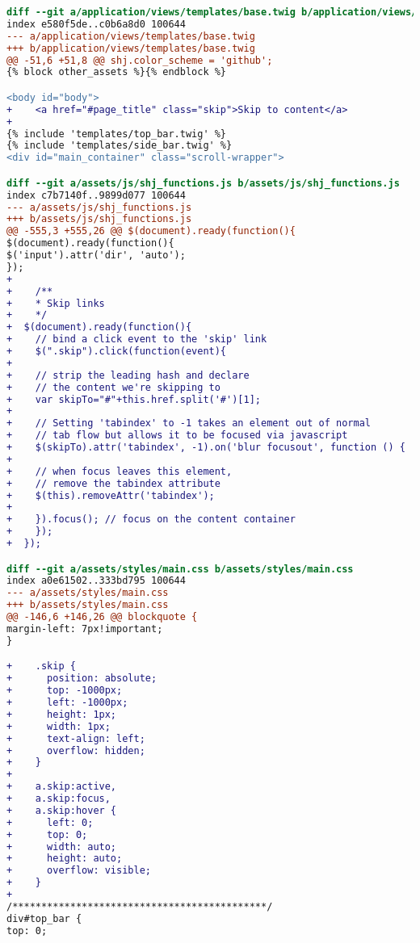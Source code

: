 \begin{lstlisting}[language=diff, caption=Perubahan untuk mematuhi kriteria 2.4.1, label=lst_2.4.1, basicstyle=\ttfamily, frame=single,
columns=fullflexible, keepspaces=true, breaklines=true]
diff --git a/application/views/templates/base.twig b/application/views/templates/base.twig
index e580f5de..c0b6a8d0 100644
--- a/application/views/templates/base.twig
+++ b/application/views/templates/base.twig
@@ -51,6 +51,8 @@ shj.color_scheme = 'github';
{% block other_assets %}{% endblock %}

<body id="body">
+    <a href="#page_title" class="skip">Skip to content</a>
+    
{% include 'templates/top_bar.twig' %}
{% include 'templates/side_bar.twig' %}
<div id="main_container" class="scroll-wrapper">

diff --git a/assets/js/shj_functions.js b/assets/js/shj_functions.js
index c7b7140f..9899d077 100644
--- a/assets/js/shj_functions.js
+++ b/assets/js/shj_functions.js
@@ -555,3 +555,26 @@ $(document).ready(function(){
$(document).ready(function(){
$('input').attr('dir', 'auto');
});
+    
+    /**
+    * Skip links
+    */
+  $(document).ready(function(){
+    // bind a click event to the 'skip' link
+    $(".skip").click(function(event){
+    
+    // strip the leading hash and declare
+    // the content we're skipping to
+    var skipTo="#"+this.href.split('#')[1];
+  
+    // Setting 'tabindex' to -1 takes an element out of normal 
+    // tab flow but allows it to be focused via javascript
+    $(skipTo).attr('tabindex', -1).on('blur focusout', function () {
+  
+    // when focus leaves this element, 
+    // remove the tabindex attribute
+    $(this).removeAttr('tabindex');
+  
+    }).focus(); // focus on the content container
+    });
+  });

diff --git a/assets/styles/main.css b/assets/styles/main.css
index a0e61502..333bd795 100644
--- a/assets/styles/main.css
+++ b/assets/styles/main.css
@@ -146,6 +146,26 @@ blockquote {
margin-left: 7px!important;
}

+    .skip {
+      position: absolute;
+      top: -1000px;
+      left: -1000px;
+      height: 1px;
+      width: 1px;
+      text-align: left;
+      overflow: hidden;
+    }
+  
+    a.skip:active, 
+    a.skip:focus, 
+    a.skip:hover {
+      left: 0; 
+      top: 0;
+      width: auto; 
+      height: auto; 
+      overflow: visible; 
+    }
+ 
/********************************************/
div#top_bar {
top: 0;
\end{lstlisting}


